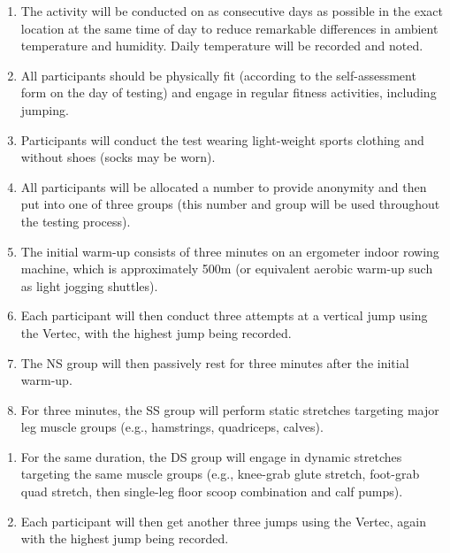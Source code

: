 \documentclass[stu, floatsintext, a4paper]{apa7}
\begin{document}
\begin{enumerate}
\item The activity will be conducted on as consecutive days as possible in the exact location at the same time of day to reduce remarkable differences in ambient temperature and humidity. Daily temperature will be recorded and noted.

\item All participants should be physically fit (according to the self-assessment form on the day of testing) and engage in regular fitness activities, including jumping.

\item Participants will conduct the test wearing light-weight sports clothing and without shoes (socks may be worn).

\item All participants will be allocated a number to provide anonymity and then put into one of three groups (this number and group will be used throughout the testing process).

\item The initial warm-up consists of three minutes on an ergometer indoor rowing machine, which is approximately 500m (or equivalent aerobic warm-up such as light jogging shuttles).

\item Each participant will then conduct three attempts at a vertical jump using the Vertec, with the highest jump being recorded.

\item The NS group will then passively rest for three minutes after the initial warm-up.

\item For three minutes, the SS group will perform static stretches targeting major leg muscle groups (e.g., hamstrings, quadriceps, calves).
\end{enumerate}


\begin{enumerate}
\item For the same duration, the DS group will engage in dynamic stretches targeting the same muscle groups (e.g., knee-grab glute stretch, foot-grab quad stretch, then single-leg floor scoop combination and calf pumps).

\item Each participant will then get another three jumps using the Vertec, again with the highest jump being recorded.
\end{enumerate}
\end{document}

